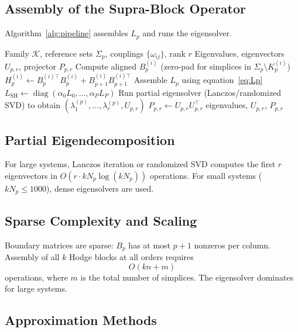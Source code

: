 \documentclass[11pt]{article}
\theoremstyle{definition}
\theoremstyle{remark}
\newcommand{\LSH}{L_{\mathrm{SH}}}
\newcommand{\Pp}{P_{p,r}}
\newcommand{\Up}{U_{p,r}}
\newcommand{\calK}{\mathcal{K}}
\DeclareMathOperator{\diag}{diag}
\begin{document}
\subsection{Assembly of the Supra-Block Operator}

Algorithm~\ref{alg:pipeline} assembles $L_p$ and runs the eigensolver.

\begin{algorithm}[h]
\caption{Supra-Hodge Pipeline}
\label{alg:pipeline}
\begin{algorithmic}[1]
\Require Family $\calK$, reference sets $\Sigma_p$, couplings $\{\omega_{ij}\}$, rank $r$
\Ensure Eigenvalues, eigenvectors $\Up$, projector $\Pp$
    \State Compute aligned $B_p^{(i)}$ (zero-pad for simplices in $\Sigma_p\setminus K_p^{(i)}$)
    \State $H_p^{(i)} \gets B_p^{(i)\top}B_p^{(i)} + B_{p+1}^{(i)}B_{p+1}^{(i)\top}$
  \EndFor
\EndFor
{}
  \State Assemble $L_p$ using equation~\eqref{eq:Lp}
\EndFor
\State $\LSH \gets \diag(\alpha_0 L_0,\dots,\alpha_P L_P)$
\State Run partial eigensolver (Lanczos/randomized SVD) to obtain $(\lambda_1^{(p)},\dots,\lambda_r^{(p)},\Up)$
\State $\Pp \gets \Up\Up^\top$
\State \Return eigenvalues, $\Up$, $\Pp$
\end{algorithmic}
\end{algorithm}

\subsection{Partial Eigendecomposition}

For large systems, Lanczos iteration or randomized SVD computes the first $r$
eigenvectors in $O(r\cdot kN_p\log(kN_p))$ operations. For small systems
($kN_p \leq 1000$), dense eigensolvers are used.

\subsection{Sparse Complexity and Scaling}

Boundary matrices are sparse: $B_p$ has at most $p+1$ nonzeros per column.
Assembly of all $k$ Hodge blocks at all orders requires
\[
  O(kn + m)
\]
operations, where $m$ is the total number of simplices. The eigensolver dominates
for large systems.

\subsection{Approximation Methods}
\end{document}
